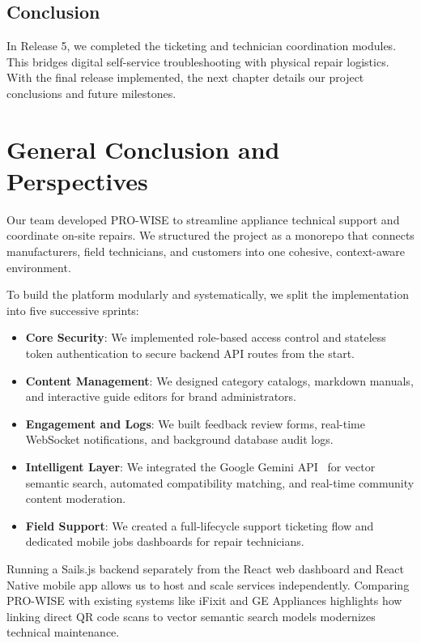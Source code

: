 \documentclass[12pt,a4paper]{report}
\begin{document}
\section{Conclusion}

In Release 5, we completed the ticketing and technician coordination modules. This bridges digital self-service troubleshooting with physical repair logistics. With the final release implemented, the next chapter details our project conclusions and future milestones.


\chapter*{General Conclusion and Perspectives}

Our team developed PRO-WISE to streamline appliance technical support and coordinate on-site repairs. We structured the project as a monorepo that connects manufacturers, field technicians, and customers into one cohesive, context-aware environment.

To build the platform modularly and systematically, we split the implementation into five successive sprints:
\begin{itemize}
    \item \textbf{Core Security}: We implemented role-based access control and stateless token authentication to secure backend API routes from the start.
    \item \textbf{Content Management}: We designed category catalogs, markdown manuals, and interactive guide editors for brand administrators.
    \item \textbf{Engagement and Logs}: We built feedback review forms, real-time WebSocket notifications, and background database audit logs.
    \item \textbf{Intelligent Layer}: We integrated the Google Gemini API~\cite{gemini} for vector semantic search, automated compatibility matching, and real-time community content moderation.
    \item \textbf{Field Support}: We created a full-lifecycle support ticketing flow and dedicated mobile jobs dashboards for repair technicians.
\end{itemize}

Running a Sails.js backend separately from the React web dashboard and React Native mobile app allows us to host and scale services independently. Comparing PRO-WISE with existing systems like iFixit and GE Appliances highlights how linking direct QR code scans to vector semantic search models modernizes technical maintenance.
\end{document}
